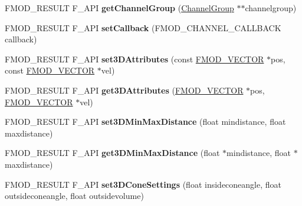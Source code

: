 \begin{DoxyCompactItemize}
\item 
F\+M\+O\+D\+\_\+\+R\+E\+S\+U\+LT F\+\_\+\+A\+PI {\bfseries get\+Channel\+Group} (\hyperlink{class_f_m_o_d_1_1_channel_group}{Channel\+Group} $\ast$$\ast$channelgroup)\hypertarget{class_f_m_o_d_1_1_channel_a4b6d310d04eb844190db7a4074af2b2c}{}\label{class_f_m_o_d_1_1_channel_a4b6d310d04eb844190db7a4074af2b2c}

\item 
F\+M\+O\+D\+\_\+\+R\+E\+S\+U\+LT F\+\_\+\+A\+PI {\bfseries set\+Callback} (F\+M\+O\+D\+\_\+\+C\+H\+A\+N\+N\+E\+L\+\_\+\+C\+A\+L\+L\+B\+A\+CK callback)\hypertarget{class_f_m_o_d_1_1_channel_a5cbbb69ad8d74d36d7b469a77450c3fa}{}\label{class_f_m_o_d_1_1_channel_a5cbbb69ad8d74d36d7b469a77450c3fa}

\item 
F\+M\+O\+D\+\_\+\+R\+E\+S\+U\+LT F\+\_\+\+A\+PI {\bfseries set3\+D\+Attributes} (const \hyperlink{struct_f_m_o_d___v_e_c_t_o_r}{F\+M\+O\+D\+\_\+\+V\+E\+C\+T\+OR} $\ast$pos, const \hyperlink{struct_f_m_o_d___v_e_c_t_o_r}{F\+M\+O\+D\+\_\+\+V\+E\+C\+T\+OR} $\ast$vel)\hypertarget{class_f_m_o_d_1_1_channel_ae0bb0f7c1c1a807bde8ab9e9c3870785}{}\label{class_f_m_o_d_1_1_channel_ae0bb0f7c1c1a807bde8ab9e9c3870785}

\item 
F\+M\+O\+D\+\_\+\+R\+E\+S\+U\+LT F\+\_\+\+A\+PI {\bfseries get3\+D\+Attributes} (\hyperlink{struct_f_m_o_d___v_e_c_t_o_r}{F\+M\+O\+D\+\_\+\+V\+E\+C\+T\+OR} $\ast$pos, \hyperlink{struct_f_m_o_d___v_e_c_t_o_r}{F\+M\+O\+D\+\_\+\+V\+E\+C\+T\+OR} $\ast$vel)\hypertarget{class_f_m_o_d_1_1_channel_ab0f5e28337f9303c75f80d139201a858}{}\label{class_f_m_o_d_1_1_channel_ab0f5e28337f9303c75f80d139201a858}

\item 
F\+M\+O\+D\+\_\+\+R\+E\+S\+U\+LT F\+\_\+\+A\+PI {\bfseries set3\+D\+Min\+Max\+Distance} (float mindistance, float maxdistance)\hypertarget{class_f_m_o_d_1_1_channel_aa6ee9a231435079405ec4a2c2bd07c44}{}\label{class_f_m_o_d_1_1_channel_aa6ee9a231435079405ec4a2c2bd07c44}

\item 
F\+M\+O\+D\+\_\+\+R\+E\+S\+U\+LT F\+\_\+\+A\+PI {\bfseries get3\+D\+Min\+Max\+Distance} (float $\ast$mindistance, float $\ast$maxdistance)\hypertarget{class_f_m_o_d_1_1_channel_ae997142f79c9e96414f0ecce05fa93a3}{}\label{class_f_m_o_d_1_1_channel_ae997142f79c9e96414f0ecce05fa93a3}

\item 
F\+M\+O\+D\+\_\+\+R\+E\+S\+U\+LT F\+\_\+\+A\+PI {\bfseries set3\+D\+Cone\+Settings} (float insideconeangle, float outsideconeangle, float outsidevolume)\hypertarget{class_f_m_o_d_1_1_channel_a9e0d8885d31b2978683d5305924de565}{}\label{class_f_m_o_d_1_1_channel_a9e0d8885d31b2978683d5305924de565}


\end{DoxyCompactItemize}
